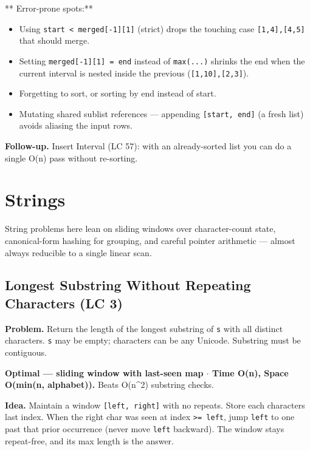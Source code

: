 \documentclass[11pt]{article}
\providecommand{\tightlist}{\setlength{\itemsep}{1pt}\setlength{\parskip}{0pt}}
\begin{document}
** Error-prone spots:**

\begin{itemize}
\tightlist
\item
  Using \texttt{start\ \textless{}\ merged{[}-1{]}{[}1{]}} (strict) drops the touching case \texttt{{[}1,4{]},{[}4,5{]}} that should merge.
\item
  Setting \texttt{merged{[}-1{]}{[}1{]}\ =\ end} instead of \texttt{max(...)} shrinks the end when the current interval is nested inside the previous (\texttt{{[}1,10{]},{[}2,3{]}}).
\item
  Forgetting to sort, or sorting by end instead of start.
\item
  Mutating shared sublist references --- appending \texttt{{[}start,\ end{]}} (a fresh list) avoids aliasing the input rows.
\end{itemize}

\textbf{Follow-up.} Insert Interval (LC 57): with an already-sorted list you can do a single O(n) pass without re-sorting.

\section{Strings}\label{strings}

String problems here lean on sliding windows over character-count state, canonical-form hashing for grouping, and careful pointer arithmetic --- almost always reducible to a single linear scan.

\subsection{Longest Substring Without Repeating Characters (LC 3)}\label{longest-substring-without-repeating-characters-lc-3}

\textbf{Problem.} Return the length of the longest substring of \texttt{s} with all distinct characters. \texttt{s} may be empty; characters can be any Unicode. Substring must be contiguous.

\textbf{Optimal --- sliding window with last-seen map \(\cdot\) Time O(n), Space O(min(n, alphabet)).} Beats O(n\^{}2) substring checks.

\textbf{Idea.} Maintain a window \texttt{{[}left,\ right{]}} with no repeats. Store each character\textquotesingle s last index. When the right char was seen at index \texttt{\textgreater{}=\ left}, jump \texttt{left} to one past that prior occurrence (never move \texttt{left} backward). The window stays repeat-free, and its max length is the answer.
\end{document}
